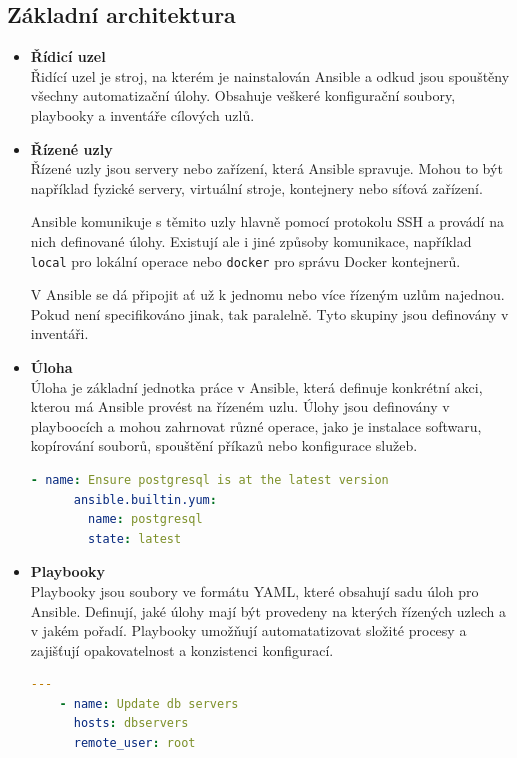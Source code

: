 \subsection{Základní architektura}
\begin{itemize}
    \item \textbf{Řídicí uzel} \\
    Řidící uzel je stroj, na kterém je nainstalován Ansible a odkud jsou spouštěny všechny automatizační úlohy.
    Obsahuje veškeré konfigurační soubory, playbooky a inventáře cílových uzlů. \cite{ansibledocs}

    \item \textbf{Řízené uzly} \\
    Řízené uzly jsou servery nebo zařízení, která Ansible spravuje. Mohou to být například fyzické servery, virtuální stroje, kontejnery nebo síťová zařízení.
    
    Ansible komunikuje s těmito uzly hlavně pomocí protokolu SSH a provádí na nich definované úlohy.
    Existují ale i jiné způsoby komunikace, například \texttt{local} pro lokální operace nebo \texttt{docker} pro správu Docker kontejnerů. \cite{ansibledocs}
    
    V Ansible se dá připojit ať už k jednomu nebo více řízeným uzlům najednou. Pokud není specifikováno jinak, tak paralelně. 
    Tyto skupiny jsou definovány v inventáři.
    \item \textbf{Úloha} \\
    Úloha je základní jednotka práce v Ansible, která definuje konkrétní akci, kterou má Ansible provést na řízeném uzlu.
    Úlohy jsou definovány v playboocích a mohou zahrnovat různé operace, jako je instalace softwaru, kopírování souborů, 
    spouštění příkazů nebo konfigurace služeb. \cite{ansibledocs}
    \begin{lstlisting}[language=YAML, caption={Ansible - ukázka úlohy}, label={lst:ansibletask}, captionpos=b]
    - name: Ensure postgresql is at the latest version
      ansible.builtin.yum:
        name: postgresql
        state: latest
    \end{lstlisting}

    \item \textbf{Playbooky} \\
    Playbooky jsou soubory ve formátu YAML, které obsahují sadu úloh pro Ansible.
    Definují, jaké úlohy mají být provedeny na kterých řízených uzlech a v jakém pořadí.
    Playbooky umožňují automatatizovat složité procesy a zajišťují opakovatelnost a konzistenci konfigurací. \cite{ansibledocs}
    \begin{lstlisting}[language=YAML, caption={Ansible - ukázka playbooku}, label={lst:ansibleplaybook}, captionpos=b]
    ---
    - name: Update db servers
      hosts: dbservers
      remote_user: root


\end{lstlisting}
\end{itemize}
